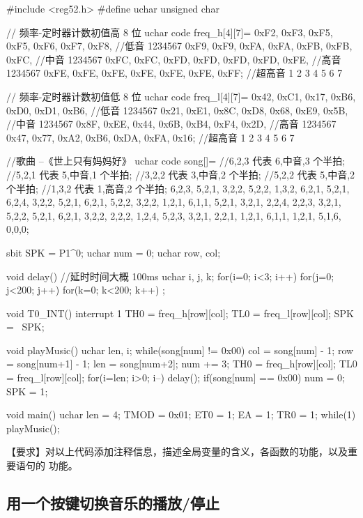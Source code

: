 \documentclass{swfulabreport}
\begin{document}
\begin{ccode}
#include <reg52.h>
#define uchar unsigned char

// 频率-定时器计数初值高 8 位
uchar code freq_h[4][7]={
   {0xF2, 0xF3, 0xF5, 0xF5, 0xF6, 0xF7, 0xF8},  //低音 1234567
   {0xF9, 0xF9, 0xFA, 0xFA, 0xFB, 0xFB, 0xFC},  //中音 1234567
   {0xFC, 0xFC, 0xFD, 0xFD, 0xFD, 0xFD, 0xFE},  //高音 1234567
   {0xFE, 0xFE, 0xFE, 0xFE, 0xFE, 0xFE, 0xFF}}; //超高音 1 2 3 4 5 6 7

// 频率-定时器计数初值低 8 位
uchar code freq_l[4][7]={
   {0x42, 0xC1, 0x17, 0xB6, 0xD0, 0xD1, 0xB6},  //低音 1234567
   {0x21, 0xE1, 0x8C, 0xD8, 0x68, 0xE9, 0x5B},  //中音 1234567
   {0x8F, 0xEE, 0x44, 0x6B, 0xB4, 0xF4, 0x2D},  //高音 1234567
   {0x47, 0x77, 0xA2, 0xB6, 0xDA, 0xFA, 0x16}}; //超高音 1 2 3 4 5 6 7

//歌曲 --《世上只有妈妈好》
uchar code song[]={
  //6,2,3 代表 6,中音,3 个半拍;
  //5,2,1 代表 5,中音,1 个半拍;
  //3,2,2 代表 3,中音,2 个半拍;
  //5,2,2 代表 5,中音,2 个半拍;
  //1,3,2 代表 1,高音,2 个半拍;
  6,2,3, 5,2,1, 3,2,2, 5,2,2, 1,3,2, 6,2,1, 5,2,1, 6,2,4,
  3,2,2, 5,2,1, 6,2,1, 5,2,2, 3,2,2, 1,2,1, 6,1,1, 5,2,1, 3,2,1, 2,2,4,
  2,2,3, 3,2,1, 5,2,2, 5,2,1, 6,2,1, 3,2,2, 2,2,2, 1,2,4,
  5,2,3, 3,2,1, 2,2,1, 1,2,1, 6,1,1, 1,2,1, 5,1,6, 0,0,0};

sbit SPK = P1^0;
uchar num = 0;
uchar row, col;

void delay()    //延时时间大概 100ms
{
  uchar i, j, k;
  for(i=0; i<3; i++)
  {
     for(j=0; j<200; j++)
     {
        for(k=0; k<200; k++)
        {
           ;
        }
     }
  }
}

void T0_INT() interrupt 1
{
  TH0 = freq_h[row][col];
  TL0 = freq_l[row][col];
  SPK = ~SPK;
}

void playMusic()
{
  uchar len, i;
  while(song[num] != 0x00)
  {
     col = song[num] - 1;
     row = song[num+1] - 1;
     len = song[num+2];
     num += 3;
     TH0 = freq_h[row][col];
     TL0 = freq_l[row][col];
     for(i=len; i>0; i--)
     {
        delay();
     }
  }
  if(song[num] == 0x00)
  {
     num = 0;
  }
  SPK = 1;
}

void main()
{
  uchar len = 4;
  TMOD = 0x01;
  ET0 = 1;
  EA = 1;
  TR0 = 1;
  while(1)
  {
     playMusic();
  }
}
\end{ccode}

【要求】对以上代码添加注释信息，描述全局变量的含义，各函数的功能，以及重要语句的
功能。

\subsection{用一个按键切换音乐的播放/停止}
\end{document}
